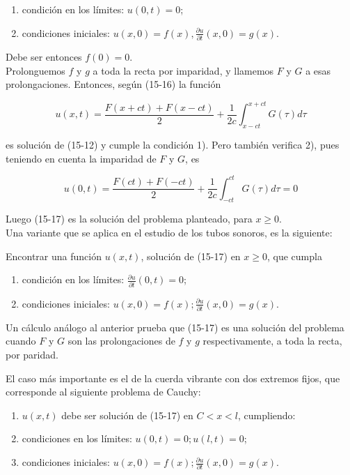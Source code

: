 \documentclass[10pt]{article}
\theoremstyle{plain}
\theoremstyle{definition}
\theoremstyle{remark}
\begin{document}
\begin{enumerate}
  \item condición en los límites: $u(0, t)=0$;
  \item condiciones iniciales: $u(x, 0)=f(x), \frac{\partial u}{\partial t}(x, 0)=g(x)$.
\end{enumerate}

Debe ser entonces $f(0)=0$.\\
Prolonguemos $f$ y $g$ a toda la recta por imparidad, y llamemos $F$ y $G$ a esas prolongaciones. Entonces, según (15-16) la función


\begin{equation*}
u(x, t)=\frac{F(x+c t)+F(x-c t)}{2}+\frac{1}{2 c} \int_{x-c t}^{x+c t} G(\tau) d \tau \tag{15-17}
\end{equation*}


es solución de (15-12) y cumple la condición 1). Pero también verifica 2), pues teniendo en cuenta la imparidad de $F$ y $G$, es

$$
u(0, t)=\frac{F(c t)+F(-c t)}{2}+\frac{1}{2 c} \int_{-c t}^{c t} G(\tau) d \tau=0
$$

Luego (15-17) es la solución del problema planteado, para $x \geqslant 0$.\\
Una variante que se aplica en el estudio de los tubos sonoros, es la siguiente:

Encontrar una función $u(x, t)$, solución de (15-17) en $x \geqslant 0$, que cumpla


\begin{enumerate}
  \item condición en los límites: $\frac{\partial u}{\partial t}(0, t)=0$;
  \item condiciones iniciales: $u(x, 0)=f(x) ; \frac{\partial u}{\partial t}(x, 0)=g(x)$.
\end{enumerate}

Un cálculo análogo al anterior prueba que (15-17) es una solución del problema cuando $F$ y $G$ son las prolongaciones de $f$ y $g$ respectivamente, a toda la recta, por paridad.

El caso más importante es el de la cuerda vibrante con dos extremos fijos, que corresponde al siguiente problema de Cauchy:

\begin{enumerate}
  \item $u(x, t)$ debe ser solución de (15-17) en $C<x<l$, cumpliendo:
  \item condiciones en los límites: $u(0, t)=0 ; u(l, t)=0$;
  \item condiciones iniciales: $u(x, 0)=f(x) ; \frac{\partial u}{\partial t}(x, 0)=g(x)$.
\end{enumerate}
\end{document}
